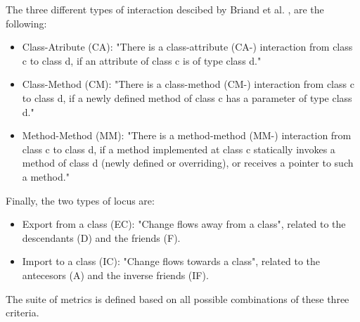 \blankls
The three different types of interaction descibed by Briand et al. \cite{briand1997investigation}, are the following:
\begin{itemize}
    \item Class-Atribute (CA): "There is a class-attribute (CA-) interaction from class c to class d, if an attribute of class c is of type class d."
    \item Class-Method (CM): "There is a class-method (CM-) interaction from class c to class d, if a newly defined method of class c has a parameter of type class d."
    \item Method-Method (MM): "There is a method-method (MM-) interaction from class c to class d, if a method implemented at class c statically invokes a method of class d (newly defined or overriding), or receives a pointer to such a method."
\end{itemize}

\blankls
Finally, the two types of locus are:
\begin{itemize}
  \item Export from a class (EC): "Change flows away from a class", related to the descendants (D) and the friends (F).
  \item Import to a class (IC): "Change flows towards a class", related to the antecesors (A) and the inverse friends (IF).
\end{itemize}

\blankls
The suite of metrics is defined based on all possible combinations of these three criteria.
